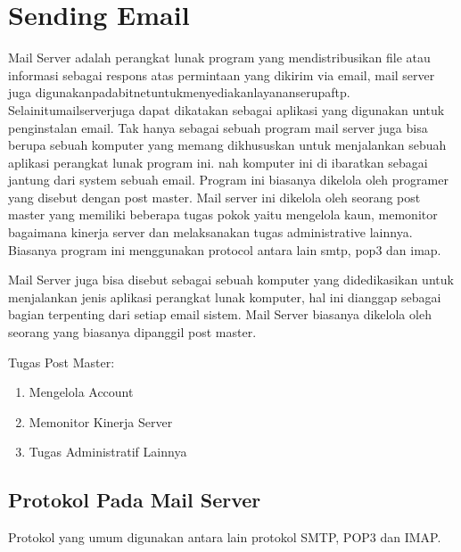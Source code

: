 
\section{Sending Email}
	Mail Server adalah perangkat lunak program yang mendistribusikan ﬁle atau informasi sebagai respons atas permintaan yang dikirim via email, mail server juga digunakanpadabitnetuntukmenyediakanlayananserupaftp. Selainitumailserverjuga dapat dikatakan sebagai aplikasi yang digunakan untuk penginstalan email.
	Tak hanya sebagai sebuah program mail server juga bisa berupa sebuah komputer yang memang dikhususkan untuk menjalankan sebuah aplikasi perangkat lunak program ini. nah komputer ini di ibaratkan sebagai jantung dari system sebuah email. Program ini biasanya dikelola oleh programer yang disebut dengan post master.
	Mail server ini dikelola oleh seorang post master yang memiliki beberapa tugas pokok yaitu mengelola kaun, memonitor bagaimana kinerja server dan melaksanakan tugas administrative lainnya. Biasanya program ini menggunakan protocol antara lain smtp, pop3 dan imap.
	
	Mail Server juga bisa disebut sebagai sebuah komputer yang didedikasikan untuk menjalankan jenis aplikasi perangkat lunak komputer, hal ini dianggap sebagai bagian terpenting dari setiap email sistem. Mail Server biasanya dikelola oleh seorang yang biasanya dipanggil post master.
 
	Tugas Post Master:
	\begin{enumerate}
		\item Mengelola Account  
		\item Memonitor Kinerja Server 
		\item Tugas Administratif Lainnya
	\end{enumerate}

\subsection {Protokol Pada Mail Server}
	Protokol yang umum digunakan antara lain protokol SMTP, POP3 dan IMAP.
	
